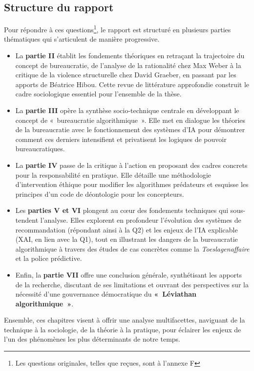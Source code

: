 \subsection{Structure du rapport}
Pour répondre à ces questions\footnote{Les questions originales, telles que reçues, sont à l'annexe F}, le rapport est structuré en plusieurs parties thématiques qui s'articulent de manière progressive.
\begin{itemize}[label=\S]
    \item La \textbf{partie II} établit les fondements théoriques en retraçant la trajectoire du concept de bureaucratie, de l'analyse de la rationalité chez Max Weber à la critique de la violence structurelle chez David Graeber, en passant par les apports de Béatrice Hibou. Cette revue de littérature approfondie construit le cadre sociologique essentiel pour l'ensemble de la thèse.
    \item La \textbf{partie III} opère la synthèse socio-technique centrale en développant le concept de «~bureaucratie algorithmique~». Elle met en dialogue les théories de la bureaucratie avec le fonctionnement des systèmes d'IA pour démontrer comment ces derniers intensifient et privatisent les logiques de pouvoir bureaucratiques.
    \item La \textbf{partie IV} passe de la critique à l'action en proposant des cadres concrets pour la responsabilité en pratique. Elle détaille une méthodologie d'intervention éthique pour modifier les algorithmes prédateurs et esquisse les principes d'un code de déontologie pour les concepteurs.
    \item Les \textbf{parties V et VI} plongent au cœur des fondements techniques qui sous-tendent l'analyse. Elles explorent en profondeur l'évolution des systèmes de recommandation (répondant ainsi à la Q2) et les enjeux de l'IA explicable (XAI, en lien avec la Q1), tout en illustrant les dangers de la bureaucratie algorithmique à travers des études de cas concrètes comme la \textit{Toeslagenaffaire} et la police prédictive.
    \item Enfin, la \textbf{partie VII} offre une conclusion générale, synthétisant les apports de la recherche, discutant de ses limitations et ouvrant des perspectives sur la nécessité d'une gouvernance démocratique du \textbf{«~Léviathan algorithmique~»}.
\end{itemize}

Ensemble, ces chapitres visent à offrir une analyse multifacettes, naviguant de la technique à la sociologie, de la théorie à la pratique, pour éclairer les enjeux de l'un des phénomènes les plus déterminants de notre temps.

